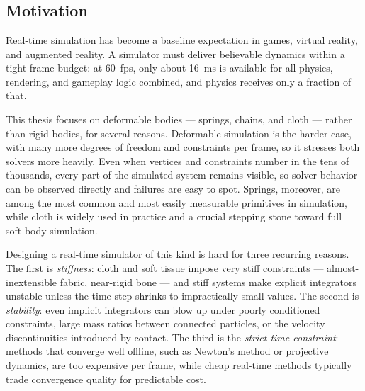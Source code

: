 \chapter{\bevezetes}
\label{chap:Introduction}

\section{Motivation}
\label{sec:Motivation}
Real-time simulation has become a baseline expectation in games, virtual
reality, and augmented reality. A simulator must deliver believable dynamics
within a tight frame budget: at 60~fps, only about 16~ms is available for all
physics, rendering, and gameplay logic combined, and physics receives only a
fraction of that.

This thesis focuses on deformable bodies --- springs, chains, and cloth ---
rather than rigid bodies, for several reasons. Deformable simulation is the
harder case, with many more degrees of freedom and constraints per frame, so it
stresses both solvers more heavily. Even when vertices and constraints number in
the tens of thousands, every part of the simulated system remains visible, so
solver behavior can be observed directly and failures are easy to spot. Springs,
moreover, are among the most common and most easily measurable primitives in
simulation, while cloth is widely used in practice and a crucial stepping
stone toward full soft-body simulation.

Designing a real-time simulator of this kind is hard for three recurring
reasons. The first is \emph{stiffness}: cloth and soft tissue impose very stiff
constraints --- almost-inextensible fabric, near-rigid bone --- and stiff systems
make explicit integrators unstable unless the time step shrinks to impractically
small values. The second is \emph{stability}: even implicit integrators can blow
up under poorly conditioned constraints, large mass ratios between connected
particles, or the velocity discontinuities introduced by contact. The third is
the \emph{strict time constraint}: methods that converge well offline, such as
Newton's method or projective dynamics, are too expensive per frame, while cheap
real-time methods typically trade convergence quality for predictable cost.


